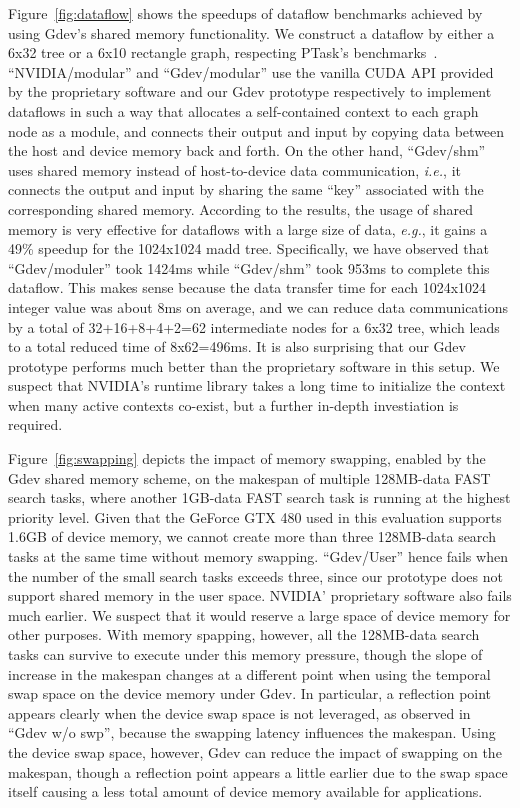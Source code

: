 Figure~\ref{fig:dataflow} shows the speedups of dataflow benchmarks
achieved by using Gdev's shared memory functionality.
We construct a dataflow by either a 6x32 tree or a 6x10 rectangle
graph, respecting PTask's benchmarks~\cite{Rossbach_SOSP11}.
``NVIDIA/modular'' and ``Gdev/modular'' use the vanilla CUDA API
provided by the proprietary software and our Gdev prototype
respectively to implement dataflows in such a way that allocates a
self-contained context to each graph node as a module, and connects
their output and input by copying data between the host and device
memory back and forth.
On the other hand, ``Gdev/shm'' uses shared memory instead of
host-to-device data communication, \textit{i.e.}, it connects the output
and input by sharing the same ``key'' associated with the corresponding
shared memory.
According to the results, the usage of shared memory is very effective
for dataflows with a large size of data, \textit{e.g.}, it gains a 49\%
speedup for the 1024x1024 madd tree.
Specifically, we have observed that ``Gdev/moduler'' took 1424ms while
``Gdev/shm'' took 953ms to complete this dataflow.
This makes sense because the data transfer time for each 1024x1024
integer value was about 8ms on average, and we can reduce data
communications by a total of 32+16+8+4+2=62 intermediate nodes for a
6x32 tree, which leads to a total reduced time of 8x62=496ms.
It is also surprising that our Gdev prototype performs much better than
the proprietary software in this setup.
We suspect that NVIDIA's runtime library takes a long time to initialize
the context when many active contexts co-exist, but a further in-depth
investiation is required.

Figure~\ref{fig:swapping} depicts the impact of memory swapping, enabled
by the Gdev shared memory scheme, on the makespan of multiple 128MB-data
FAST search tasks, where another 1GB-data FAST search task is running at
the highest priority level.
Given that the GeForce GTX 480 used in this evaluation supports
1.6GB of device memory, we cannot create more than three 128MB-data
search tasks at the same time without memory swapping.
``Gdev/User'' hence fails when the number of the small search tasks
exceeds three, since our prototype does not support shared memory in the
user space.
NVIDIA' proprietary software also fails much earlier.
We suspect that it would reserve a large space of device memory for
other purposes.
With memory spapping, however, all the 128MB-data search tasks can
survive to execute under this memory pressure, though the slope of
increase in the makespan changes at a different point when using the
temporal swap space on the device memory under Gdev.
In particular, a reflection point appears clearly when the device swap
space is not leveraged, as observed in ``Gdev w/o swp'', because the
swapping latency influences the makespan.
Using the device swap space, however, Gdev can reduce the impact of
swapping on the makespan, though a reflection point appears a little
earlier due to the swap space itself causing a less total amount of
device memory available for applications.

